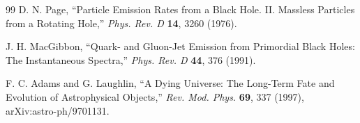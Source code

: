 \documentclass[11pt]{article}
\begin{document}
\begin{thebibliography}{99}
 D. N. Page, ``Particle Emission Rates from a Black Hole. II. Massless Particles from a Rotating Hole,'' \textit{Phys. Rev. D} \textbf{14}, 3260 (1976).

 J. H. MacGibbon, ``Quark- and Gluon-Jet Emission from Primordial Black Holes: The Instantaneous Spectra,'' \textit{Phys. Rev. D} \textbf{44}, 376 (1991).

 F. C. Adams and G. Laughlin, ``A Dying Universe: The Long-Term Fate and Evolution of Astrophysical Objects,'' \textit{Rev. Mod. Phys.} \textbf{69}, 337 (1997), arXiv:astro-ph/9701131.

\end{thebibliography}
\end{document}
